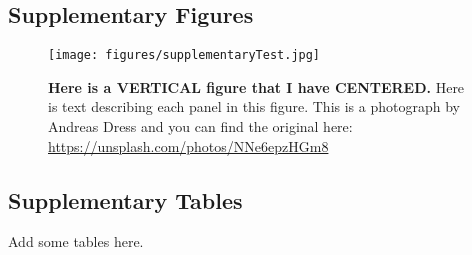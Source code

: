 \documentclass{getwriting}
\begin{document}
\subsection*{Supplementary Figures}
\begin{figure}[H]
\begin{center}
\texttt{[image: figures/supplementaryTest.jpg]}
\end{center}
\caption{\textbf{Here is a VERTICAL figure that I have CENTERED.} Here is text describing each panel in this figure. This is a photograph by Andreas Dress and you can find the original here: \url{https://unsplash.com/photos/NNe6epzHGm8}}
\label{fig:supplementaryfigure1}
\end{figure}
\newpage
\subsection*{Supplementary Tables}
Add some tables here.
\newpage

\end{document}
